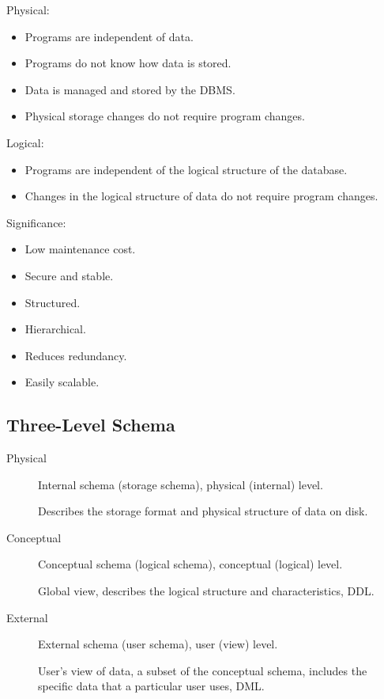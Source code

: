 \documentclass[11pt,journal,compsoc]{IEEEtran}
\begin{document}
Physical:

\begin{itemize}
    \item Programs are independent of data.
    \item Programs do not know how data is stored.
    \item Data is managed and stored by the DBMS.
    \item Physical storage changes do not require program changes.
\end{itemize}

Logical:

\begin{itemize}
    \item Programs are independent of the logical structure of the database.
    \item Changes in the logical structure of data do not require program changes.
\end{itemize}

Significance:

\begin{itemize}
    \item Low maintenance cost.
    \item Secure and stable.
    \item Structured.
    \item Hierarchical.
    \item Reduces redundancy.
    \item Easily scalable.
\end{itemize}

\subsection{Three-Level Schema}

\begin{description}
    \item[Physical]
    Internal schema (storage schema), physical (internal) level.
    
    Describes the storage format and physical structure of data on disk.

    \item[Conceptual]
    Conceptual schema (logical schema), conceptual (logical) level.
    
    Global view, describes the logical structure and characteristics, DDL.

    \item[External]
    External schema (user schema), user (view) level.
    
    User's view of data, a subset of the conceptual schema, includes the specific data that a particular user uses, DML.
\end{description}
\end{document}
